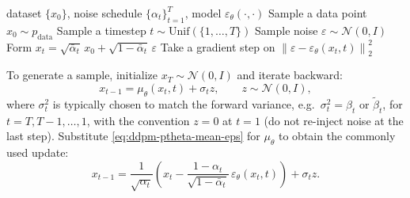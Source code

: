 \documentclass[../main]{subfiles}
\begin{document}
\begin{algorithm}[H]
\caption{DDPM training (noise prediction)}
\begin{algorithmic}[1]
\Require dataset $\{x_0\}$, noise schedule $\{\alpha_t\}_{t=1}^T$, model $\varepsilon_\theta(\cdot,\cdot)$
\Repeat
    \State Sample a data point $x_0\sim p_{\mathrm{data}}$
    \State Sample a timestep $t\sim\mathrm{Unif}(\{1,\dots,T\})$
    \State Sample noise $\varepsilon\sim\mathcal N(0,I)$
    \State Form $x_t = \sqrt{\bar\alpha_t}\,x_0 + \sqrt{1-\bar\alpha_t}\,\varepsilon$
    \State Take a gradient step on $\left\|\varepsilon - \varepsilon_\theta(x_t,t)\right\|_2^2$
\end{algorithmic}
\end{algorithm}

To generate a sample, initialize $x_T\sim\mathcal N(0,I)$ and iterate backward:
\begin{equation}\label{eq:ddpm-sampling-step}
    x_{t-1}
    =
    \mu_\theta(x_t,t) + \sigma_t z,
    \qquad
    z\sim\mathcal N(0,I),
\end{equation}
where $\sigma_t^2$ is typically chosen to match the forward variance,
e.g.\ $\sigma_t^2=\beta_t$ or $\tilde\beta_t$, for $t=T,T-1,\dots,1$, with the convention $z=0$ at $t=1$ (do not re-inject noise at the last step).
Substitute \eqref{eq:ddpm-ptheta-mean-eps} for $\mu_\theta$ to obtain the commonly used update:
\begin{equation}
    x_{t-1}
    =
    \frac{1}{\sqrt{\alpha_t}}
    \left(
        x_t - \frac{1-\alpha_t}{\sqrt{1-\bar\alpha_t}}\,\varepsilon_\theta(x_t,t)
    \right)
    + \sigma_t z.
\end{equation}
\end{document}

